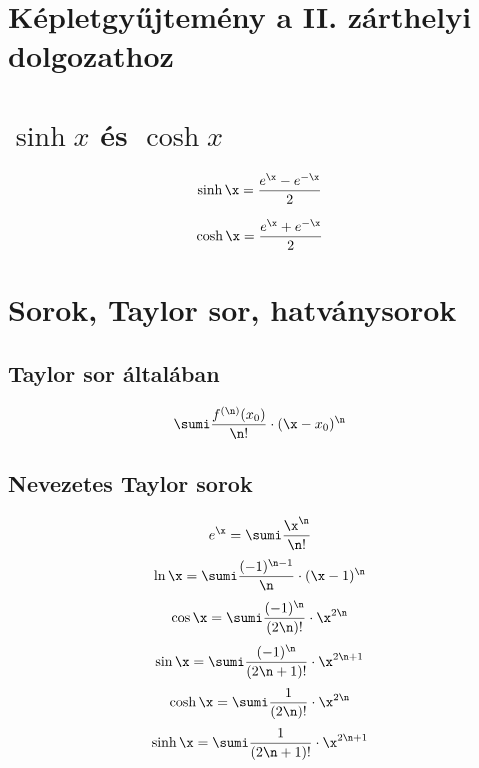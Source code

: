 \renewcommand{\arraystretch}{1.2}

\section{Képletgyűjtemény a II. zárthelyi dolgozathoz}

\section*{$\sinh x$ és $\cosh x$}
\begin{minipage}{0.5\textwidth}
\begin{equation}
\sinh \x = \frac{e^{\x} - e^{-\x}}{2}
\end{equation}
\end{minipage}
\begin{minipage}{0.5\textwidth}
\begin{equation}
\cosh \x = \frac{e^{\x} + e^{-\x}}{2}
\end{equation}
\end{minipage}

\section*{Sorok, Taylor sor, hatványsorok}
\subsection*{Taylor sor általában}

\begin{equation}
\sumi \frac{f^{(\n)}(x_0)}{\n!} \cdot (\x-x_0)^{\n}
\end{equation}

\subsection*{Nevezetes Taylor sorok}
\begin{equation}
e^{\x} = \sumi \frac{{\x}^{\n}}{\n!}
\end{equation}
\begin{equation}
\ln \x = \sumi \frac{(-1)^{\n-1}}{\n} \cdot (\x-1)^{\n}
\end{equation}
\begin{equation}
\cos \x = \sumi \frac{(-1)^{\n}}{(2\n)!} \cdot \x^{2\n}
\end{equation}
\begin{equation}
\sin \x = \sumi \frac{(-1)^{\n}}{(2\n+1)!} \cdot \x^{2\n+1}
\end{equation}
\begin{equation}
\cosh \x = \sumi \frac{1}{(2\n)!} \cdot \x^{2\n}
\end{equation}
\begin{equation}
\sinh \x = \sumi \frac{1}{(2\n+1)!} \cdot \x^{2\n+1}
\end{equation}

